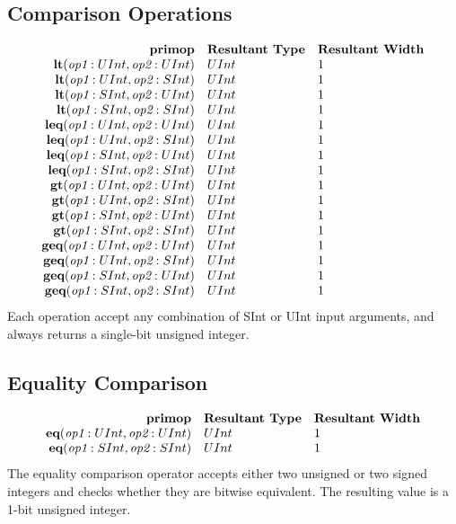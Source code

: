 \documentclass[12pt]{article}
\begin{document}
\subsection{Comparison Operations}
\[
\begin{array}{rll}
\text{\bf primop} & \text{\bf Resultant Type} & \text{\bf Resultant Width} \\
\text{\bf lt}      (\text{\em op1}:UInt, \text{\em op2}:UInt) & UInt & 1    \\
\text{\bf lt}      (\text{\em op1}:UInt, \text{\em op2}:SInt) & UInt & 1    \\
\text{\bf lt}      (\text{\em op1}:SInt, \text{\em op2}:UInt) & UInt & 1    \\
\text{\bf lt}      (\text{\em op1}:SInt, \text{\em op2}:SInt) & UInt & 1    \\
\text{\bf leq}     (\text{\em op1}:UInt, \text{\em op2}:UInt) & UInt & 1    \\
\text{\bf leq}     (\text{\em op1}:UInt, \text{\em op2}:SInt) & UInt & 1    \\
\text{\bf leq}     (\text{\em op1}:SInt, \text{\em op2}:UInt) & UInt & 1    \\
\text{\bf leq}     (\text{\em op1}:SInt, \text{\em op2}:SInt) & UInt & 1    \\
\text{\bf gt}      (\text{\em op1}:UInt, \text{\em op2}:UInt) & UInt & 1    \\
\text{\bf gt}      (\text{\em op1}:UInt, \text{\em op2}:SInt) & UInt & 1    \\
\text{\bf gt}      (\text{\em op1}:SInt, \text{\em op2}:UInt) & UInt & 1    \\
\text{\bf gt}      (\text{\em op1}:SInt, \text{\em op2}:SInt) & UInt & 1    \\
\text{\bf geq}     (\text{\em op1}:UInt, \text{\em op2}:UInt) & UInt & 1    \\
\text{\bf geq}     (\text{\em op1}:UInt, \text{\em op2}:SInt) & UInt & 1    \\
\text{\bf geq}     (\text{\em op1}:SInt, \text{\em op2}:UInt) & UInt & 1    \\
\text{\bf geq}     (\text{\em op1}:SInt, \text{\em op2}:SInt) & UInt & 1    \\
\end{array}
\]
Each operation accept any combination of SInt or UInt input arguments, and always returns a single-bit unsigned integer.

\subsection{Equality Comparison}
\[
\begin{array}{rll}
\text{\bf primop} & \text{\bf Resultant Type} & \text{\bf Resultant Width} \\
\text{\bf eq}(\text{\em op1}:UInt, \text{\em op2}:UInt)     & UInt & 1 \\
\text{\bf eq}(\text{\em op1}:SInt, \text{\em op2}:SInt)     & UInt & 1 \\
\end{array}
\]
The equality comparison operator accepts either two unsigned or two signed integers and checks whether they are bitwise equivalent.
The resulting value is a 1-bit unsigned integer. 
\end{document}
